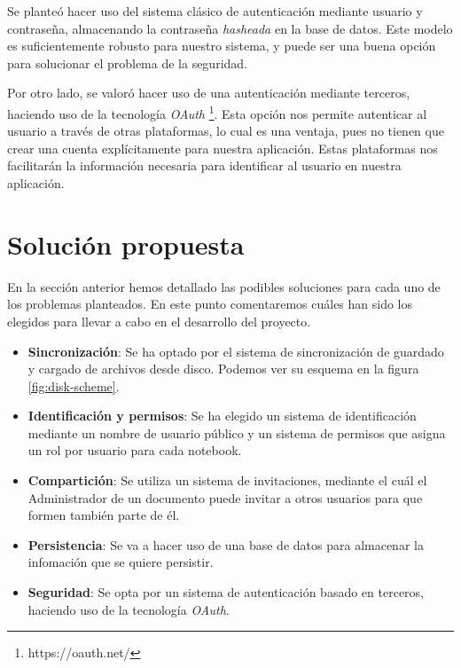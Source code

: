 \documentclass[11pt,spanish,listoffigures,listoftables]{tfgetsinf}
\begin{document}
Se planteó hacer uso del sistema clásico de autenticación mediante usuario y contraseña, almacenando la contraseña \textit{hasheada} en la base de datos. Este modelo es suficientemente robusto para nuestro sistema, y puede ser una buena opción para solucionar el problema de la seguridad.

Por otro lado, se valoró hacer uso de una autenticación mediante terceros, haciendo uso de la tecnología \textit{OAuth} \footnote{https://oauth.net/}. Esta opción nos permite autenticar al usuario a través de otras plataformas, lo cual es una ventaja, pues no tienen que crear una cuenta explícitamente para nuestra aplicación. Estas plataformas nos facilitarán la información necesaria para identificar al usuario en nuestra aplicación.



\section{Solución propuesta}
\label{sec:solucion-propuesta}

En la sección anterior hemos detallado las podibles soluciones para cada uno de los problemas planteados. En este punto comentaremos cuáles han sido los elegidos para llevar a cabo en el desarrollo del proyecto.

\begin{itemize}

\item \textbf{Sincronización}: Se ha optado por el sistema de sincronización de guardado y cargado de archivos desde disco. Podemos ver su esquema en la figura \ref{fig:disk-scheme}. 

\item \textbf{Identificación y permisos}: Se ha elegido un sistema de identificación mediante un nombre de usuario público y un sistema de permisos que asigna un rol por usuario para cada notebook.

\item \textbf{Compartición}: Se utiliza un sistema de invitaciones, mediante el cuál el Administrador de un documento puede invitar a otros usuarios para que formen también parte de él.

\item \textbf{Persistencia}: Se va a hacer uso de una base de datos para almacenar la infomación que se quiere persistir.

\item \textbf{Seguridad}: Se opta por un sistema de autenticación basado en terceros, haciendo uso de la tecnología \textit{OAuth}.

\end{itemize}
\end{document}

